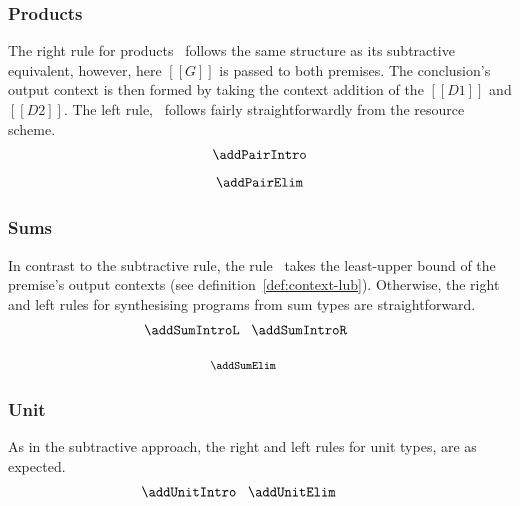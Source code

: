 \subsubsection{Products}
The right rule for products \addPairIntroName\ follows the same structure as its
subtractive equivalent, however, here $[[ G ]]$ is passed to both premises.
The conclusion's output context is then formed by taking the context addition of
the $[[ D1 ]]$ and $[[ D2 ]]$. The left rule, \addPairElimName\ follows fairly
straightforwardly from the resource scheme.
\begin{align*}
\begin{array}{c}
  \addPairIntro
\\[0.8em]
  \addPairElim
\end{array}
  \end{align*}

\subsubsection{Sums}
In contrast to the subtractive rule, the rule \addSumElimName\ takes the least-upper bound of
the premise's output contexts (see definition~\ref{def:context-lub}). Otherwise,
the right and left rules for synthesising programs from sum types are straightforward.
\begin{align*}
\begin{array}{c}
  \hspace{-2em}\addSumIntroL
  \;\;\;
  \addSumIntroR
\\[1.25em]
\hspace{-2em}{\footnotesize{\!\!\addSumElim}}
\end{array}
  \end{align*}

\subsubsection{Unit}
As in the subtractive approach, the right and left rules for unit types, are
as expected.
\begin{align*}
\begin{array}{c}
  \hspace{-3em}\addUnitIntro
  \;\;\;
  \addUnitElim
\end{array}
  \end{align*}


